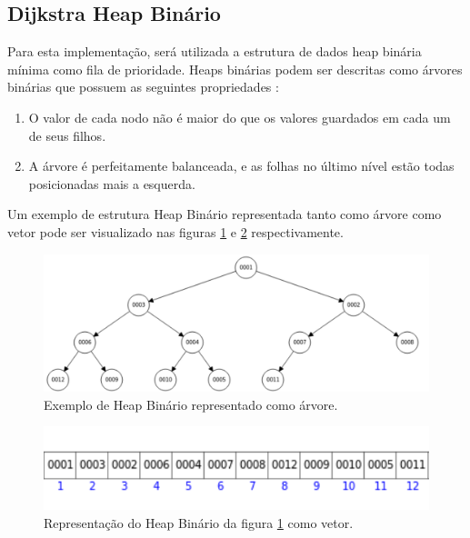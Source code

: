 \subsection{Dijkstra Heap Binário}
\label{sec-dijkstra-versoes-heap}
Para esta implementação, será utilizada a estrutura de dados heap binária mínima como fila de prioridade. Heaps binárias podem ser descritas como árvores binárias que possuem as seguintes propriedades \cite{drozdek2012data}:
\begin{enumerate}
 \item O valor de cada nodo não é maior do que os valores guardados em cada um de seus filhos.
 \item A árvore é perfeitamente balanceada, e as folhas no último nível estão todas posicionadas mais a esquerda.
\end{enumerate}

Um exemplo de estrutura Heap Binário representada tanto como árvore como vetor pode ser visualizado nas figuras \ref{fig-dijkstra-heapbinario} e \ref{fig-dijkstra-heapvetor} respectivamente.

\begin{figure}[H]
\centering
\includegraphics[width=.95\textwidth]{figuras/Heap} 
\caption{Exemplo de Heap Binário representado como árvore.}
\label{fig-dijkstra-heapbinario}
\end{figure}

\begin{figure}[H]
\centering
\includegraphics[width=.60\textwidth]{figuras/Heap-vetor}
\caption{Representação do Heap Binário da figura \ref{fig-dijkstra-heapbinario} como vetor.}
\label{fig-dijkstra-heapvetor}
\end{figure}

